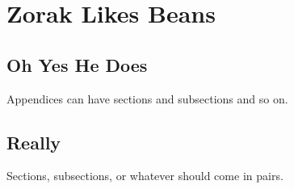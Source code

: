 \chapter{Zorak Likes Beans\label{app:a}}

\section{Oh Yes He Does}

Appendices can have sections  and subsections and so on.

\section{Really}

Sections, subsections, or whatever should come in pairs.